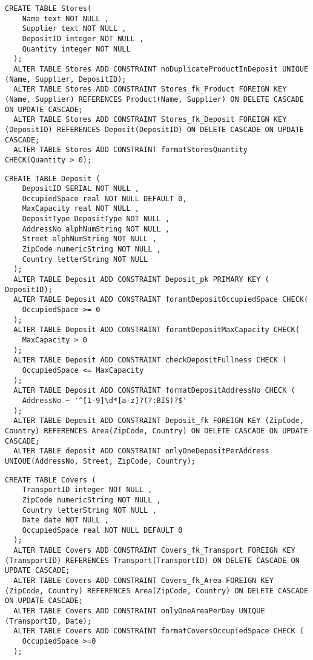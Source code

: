 \begin{lstlisting}[caption={Creazione della tabella \textbf{Stores}}]
  CREATE TABLE Stores(
    Name text NOT NULL ,
    Supplier text NOT NULL ,
    DepositID integer NOT NULL ,
    Quantity integer NOT NULL
  );
  ALTER TABLE Stores ADD CONSTRAINT noDuplicateProductInDeposit UNIQUE (Name, Supplier, DepositID);
  ALTER TABLE Stores ADD CONSTRAINT Stores_fk_Product FOREIGN KEY (Name, Supplier) REFERENCES Product(Name, Supplier) ON DELETE CASCADE ON UPDATE CASCADE;
  ALTER TABLE Stores ADD CONSTRAINT Stores_fk_Deposit FOREIGN KEY (DepositID) REFERENCES Deposit(DepositID) ON DELETE CASCADE ON UPDATE CASCADE;
  ALTER TABLE Stores ADD CONSTRAINT formatStoresQuantity CHECK(Quantity > 0);
\end{lstlisting}

\newpage

\begin{lstlisting}[caption={Creazione della tabella \textbf{Deposit}}]
  CREATE TABLE Deposit (
    DepositID SERIAL NOT NULL ,
    OccupiedSpace real NOT NULL DEFAULT 0,
    MaxCapacity real NOT NULL ,
    DepositType DepositType NOT NULL ,
    AddressNo alphNumString NOT NULL ,
    Street alphNumString NOT NULL ,
    ZipCode numericString NOT NULL ,
    Country letterString NOT NULL
  );
  ALTER TABLE Deposit ADD CONSTRAINT Deposit_pk PRIMARY KEY ( DepositID);
  ALTER TABLE Deposit ADD CONSTRAINT foramtDepositOccupiedSpace CHECK(
    OccupiedSpace >= 0
  );
  ALTER TABLE Deposit ADD CONSTRAINT foramtDepositMaxCapacity CHECK(
    MaxCapacity > 0
  );
  ALTER TABLE Deposit ADD CONSTRAINT checkDepositFullness CHECK (
    OccupiedSpace <= MaxCapacity
  );
  ALTER TABLE Deposit ADD CONSTRAINT formatDepositAddressNo CHECK (
    AddressNo ~ '^[1-9]\d*[a-z]?(?:BIS)?$'
  );
  ALTER TABLE Deposit ADD CONSTRAINT Deposit_fk FOREIGN KEY (ZipCode, Country) REFERENCES Area(ZipCode, Country) ON DELETE CASCADE ON UPDATE CASCADE;
  ALTER TABLE deposit ADD CONSTRAINT onlyOneDepositPerAddress UNIQUE(AddressNo, Street, ZipCode, Country);
\end{lstlisting}

\begin{lstlisting}[caption={Creazione della tabella \textbf{Covers}}]
  CREATE TABLE Covers (
    TransportID integer NOT NULL ,
    ZipCode numericString NOT NULL ,
    Country letterString NOT NULL ,
    Date date NOT NULL ,
    OccupiedSpace real NOT NULL DEFAULT 0
  );
  ALTER TABLE Covers ADD CONSTRAINT Covers_fk_Transport FOREIGN KEY (TransportID) REFERENCES Transport(TransportID) ON DELETE CASCADE ON UPDATE CASCADE;
  ALTER TABLE Covers ADD CONSTRAINT Covers_fk_Area FOREIGN KEY (ZipCode, Country) REFERENCES Area(ZipCode, Country) ON DELETE CASCADE ON UPDATE CASCADE;
  ALTER TABLE Covers ADD CONSTRAINT onlyOneAreaPerDay UNIQUE (TransportID, Date);
  ALTER TABLE Covers ADD CONSTRAINT formatCoversOccupiedSpace CHECK (
    OccupiedSpace >=0
  );
\end{lstlisting}

